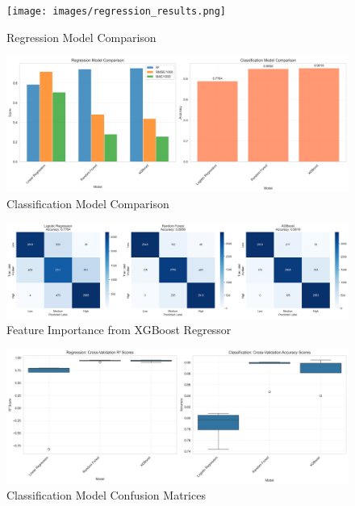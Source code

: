 \documentclass[12pt]{article}
\begin{document}
\begin{figure}[H]
    \centering
    \texttt{[image: images/regression\_results.png]}
    \caption{Regression Model Comparison}
    \label{fig:regression_comparison}
\end{figure}
\begin{figure}[H]
    \centering
    \includegraphics[width=1\textwidth]{images/model_comparison.png}
    \caption{Classification Model Comparison}
    \label{fig:classification_comparison}
\end{figure}
\begin{figure}
    \centering
    \includegraphics[width=1\textwidth]{images/confusion_matrices.png}
    \caption{Feature Importance from XGBoost Regressor}
    \label{fig:feature_importance}
\end{figure}
\begin{figure}
    \centering
    \includegraphics[width=1\textwidth]{images/cross_validation_comparison.png}
    \caption{Classification Model Confusion Matrices}
    \label{fig:classification_confusion_matrices}
\end{figure}
\end{document}
